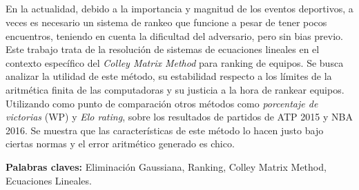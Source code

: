 \begin{addmargin}[5em]{5em}
\section*{\centering \runtitulo}

\noindent En la actualidad, debido a la importancia y magnitud de los eventos deportivos, a veces es necesario un sistema de rankeo que funcione a pesar de tener pocos encuentros, teniendo en cuenta la dificultad del adversario, pero sin bias previo. Este trabajo trata de la resolución de sistemas de ecuaciones lineales en el contexto específico del \textit{Colley Matrix Method} para ranking de equipos. 
Se busca analizar la utilidad de este método, su estabilidad respecto a los límites de la aritmética finita de las computadoras y su justicia a la hora de rankear equipos. Utilizando como punto de comparación otros métodos como \textit{porcentaje de victorias} (WP) y \textit{Elo rating}, sobre los resultados de partidos de ATP 2015 y NBA 2016.
Se muestra que las características de este método lo hacen justo bajo ciertas normas y el error aritmético generado es chico.

\bigskip

\noindent\textbf{Palabras claves:} Eliminación Gaussiana, Ranking, Colley Matrix Method, Ecuaciones Lineales.
\end{addmargin}